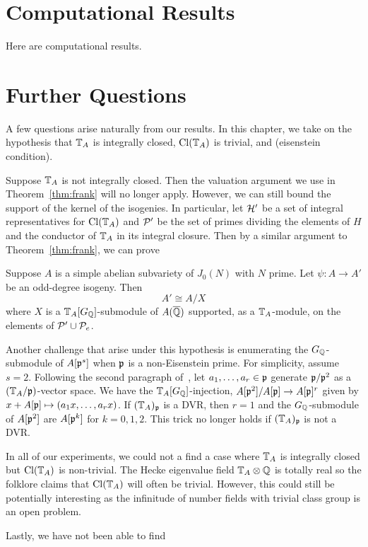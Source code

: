 \documentclass[thesis.tex]{subfiles}
\begin{document}
\section{Computational Results}

Here are computational results.

\section{Further Questions}

A few questions arise naturally from our results. In this chapter, we take on
the hypothesis that $\TT_A$ is integrally closed, $\Cl(\TT_A)$ is trivial, and
(eisenstein condition).

Suppose $\TT_A$ is not integrally closed. Then the valuation argument we use in
Theorem~\ref{thm:frank} will no longer apply. However, we can still bound the
support of the kernel of the isogenies. In particular, let $\H'$ be a set of
integral representatives for $\Cl(\TT_A)$ and $\P'$ be the set of primes
dividing the elements of $H$ and the conductor of $\TT_A$ in its integral
closure. Then by a similar argument to Theorem~\ref{thm:frank}, we can prove
\begin{proposition}
    Suppose $A$ is a simple abelian subvariety of $J_0(N)$ with $N$ prime.
    Let $\psi:A\to A'$ be an odd-degree isogeny. Then
    \[
        A'\cong A/X
    \]
    where $X$ is a $\TT_A[G_\QQ]$-submodule of $A(\QQbar)$ supported, as a
    $\TT_A$-module, on the elements of $\P'\cup \P_e$.
\end{proposition}
Another challenge that arise under this hypothesis is enumerating the
$G_\QQ$-submodule of $A[\p^s]$ when $\p$ is a non-Eisenstein prime. For
simplicity, assume $s=2$. Following
the second paragraph of~\cite[\S 14]{mazur:eisenstein}, let $a_1,\ldots,a_r\in
\p$ generate $\p/\p^2$ as a $(\TT_A/\p)$-vector space. We have the
$\TT_A[G_\QQ]$-injection, $A[\p^2]/A[\p]\to A[\p]^r$ given by $x+A[\p]\mapsto
(a_1x,\ldots,a_rx)$. If $(\TT_A)_\p$ is a DVR\@, then $r=1$ and the
$G_\QQ$-submodule of $A[\p^2]$ are $A[\p^k]$ for $k=0,1,2$. This trick no
longer holds if $(\TT_A)_\p$ is not a DVR\@.

In all of our experiments, we could not a find a case where $\TT_A$ is
integrally closed but $\Cl(\TT_A)$ is non-trivial. The Hecke eigenvalue field
$\TT_A\otimes \QQ$ is totally real so the folklore claims that $\Cl(\TT_A)$
will often be trivial. However, this could still be potentially interesting as
the infinitude of number fields with trivial class group is an open problem. 

Lastly, we have not been able to find 
\end{document}
